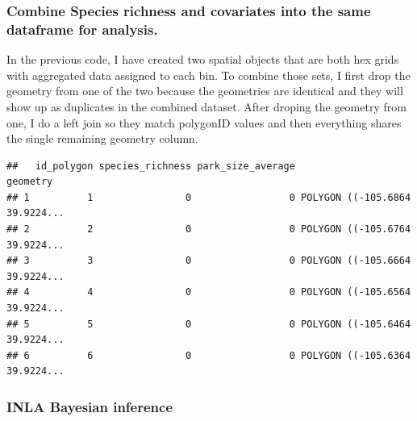 \documentclass[
]{article}
\newenvironment{Shaded}{\begin{snugshade}}{\end{snugshade}}
\newcommand{\DataTypeTok}[1]{\textcolor[rgb]{0.13,0.29,0.53}{#1}}
\newcommand{\KeywordTok}[1]{\textcolor[rgb]{0.13,0.29,0.53}{\textbf{#1}}}
\newcommand{\NormalTok}[1]{#1}
\newcommand{\OperatorTok}[1]{\textcolor[rgb]{0.81,0.36,0.00}{\textbf{#1}}}
\newcommand{\StringTok}[1]{\textcolor[rgb]{0.31,0.60,0.02}{#1}}
\begin{document}
\hypertarget{combine-species-richness-and-covariates-into-the-same-dataframe-for-analysis.}{%
\subsubsection{Combine Species richness and covariates into the same
dataframe for
analysis.}\label{combine-species-richness-and-covariates-into-the-same-dataframe-for-analysis.}}

In the previous code, I have created two spatial objects that are both
hex grids with aggregated data assigned to each bin. To combine those
sets, I first drop the geometry from one of the two because the
geometries are identical and they will show up as duplicates in the
combined dataset. After droping the geometry from one, I do a left join
so they match polygonID values and then everything shares the single
remaining geometry column.

\begin{Shaded}
\end{Shaded}

\begin{verbatim}
##   id_polygon species_richness park_size_average                       geometry
## 1          1                0                 0 POLYGON ((-105.6864 39.9224...
## 2          2                0                 0 POLYGON ((-105.6764 39.9224...
## 3          3                0                 0 POLYGON ((-105.6664 39.9224...
## 4          4                0                 0 POLYGON ((-105.6564 39.9224...
## 5          5                0                 0 POLYGON ((-105.6464 39.9224...
## 6          6                0                 0 POLYGON ((-105.6364 39.9224...
\end{verbatim}

\hypertarget{inla-bayesian-inference}{%
\subsubsection{INLA Bayesian inference}\label{inla-bayesian-inference}}
\end{document}
